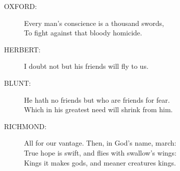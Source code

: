 \documentclass{article}
\begin{document}
\begin{description}
\item[OXFORD:] 
\hspace{1pt}Every man's conscience is a thousand swords,\\
\hspace{1pt}To fight against that bloody homicide.\\
\end{description}
\begin{description}
\item[HERBERT:] 
\hspace{1pt}I doubt not but his friends will fly to us.\\
\end{description}
\begin{description}
\item[BLUNT:] 
\hspace{1pt}He hath no friends but who are friends for fear.\\
\hspace{1pt}Which in his greatest need will shrink from him.\\
\end{description}
\begin{description}
\item[RICHMOND:] 
\hspace{1pt}All for our vantage. Then, in God's name, march:\\
\hspace{1pt}True hope is swift, and flies with swallow's wings:\\
\hspace{1pt}Kings it makes gods, and meaner creatures kings.\\
\end{description}
\centering{\it [Exeunt]}\\
\end{document}
